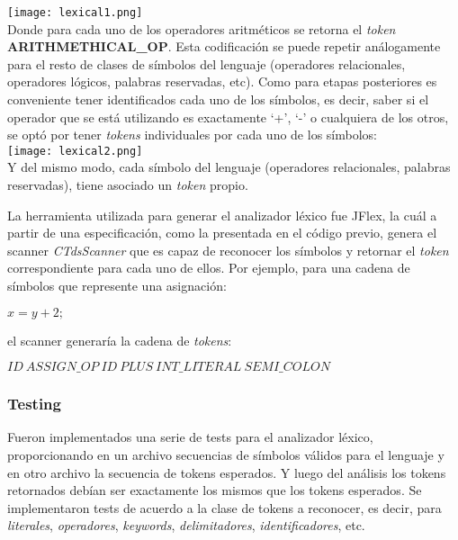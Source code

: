 \documentclass[11pt,a4paper]{article}
\begin{document}
\texttt{[image: lexical1.png]} \\ 
 
Donde para cada uno de los operadores aritméticos se retorna el \textit{token} \textbf{ARITHMETHICAL_OP}. Esta codificación se puede repetir análogamente para el resto de clases de símbolos del lenguaje (operadores relacionales, operadores lógicos, palabras reservadas, etc). Como para etapas posteriores es conveniente tener identificados cada uno de los símbolos, es decir, saber si el operador que se está utilizando es exactamente `+', `-' o cualquiera de los otros, se optó por tener \textit{tokens} individuales por cada uno de los símbolos:
\\

\texttt{[image: lexical2.png]} \\ 

Y del mismo modo, cada símbolo del lenguaje (operadores relacionales, palabras reservadas), tiene asociado un \textit{token} propio.

La herramienta utilizada para generar el analizador léxico fue JFlex, la cuál a partir de una especificación, como la presentada en el código previo, genera el scanner \textit{CTdsScanner} que es capaz de reconocer los símbolos y retornar el \textit{token} correspondiente para cada uno de ellos. Por ejemplo, para una cadena de símbolos que represente una asignación:
\begin{center}
	$x = y+2 ;$
\end{center}
el scanner generaría la cadena de \textit{tokens}:
\begin{center}
	$ID \ ASSIGN\_OP \ ID \ PLUS \ INT\_LITERAL \ SEMI\_COLON$
\end{center}

\subsubsection{Testing}

Fueron implementados una serie de tests para el analizador léxico, proporcionando en un archivo secuencias de símbolos válidos para el lenguaje y en otro archivo la secuencia de tokens esperados. Y luego del análisis los tokens retornados debían ser exactamente los mismos que los tokens esperados. Se implementaron tests de acuerdo a la clase de tokens a reconocer, es decir, para \textit{literales}, \textit{operadores}, \textit{keywords}, \textit{delimitadores}, \textit{identificadores}, etc.
\end{document}
